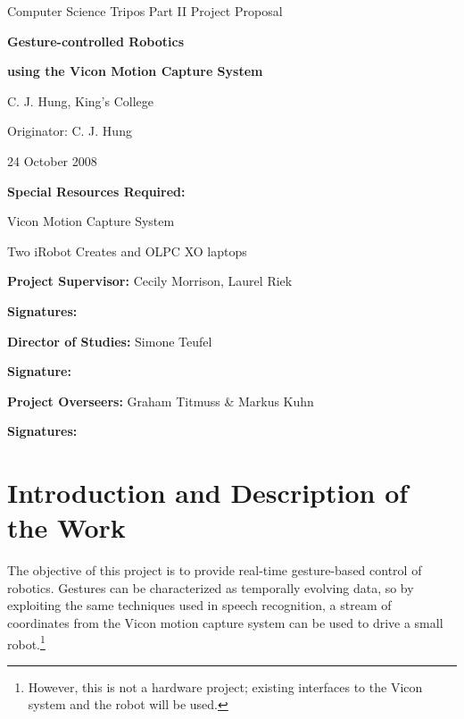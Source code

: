 \vfil

\centerline{\Large Computer Science Tripos Part II Project Proposal}
\vspace{0.4in}
\centerline{\Large \bf{Gesture-controlled Robotics}}
\vspace{0.1in}
\centerline{\Large \bf{using the Vicon Motion Capture System}}
\vspace{0.5in}
\centerline{\large C. J. Hung, King's College}
\vspace{0.2in}
\centerline{\large Originator: C. J. Hung}
\vspace{0.2in}
\centerline{\large 24 October 2008}

\vfil

\vspace{0.75in}

\noindent
{\bf Special Resources Required:}

Vicon Motion Capture System

Two iRobot Creates and OLPC XO laptops
\vspace{0.2in}

\noindent
{\bf Project Supervisor:} Cecily Morrison, Laurel Riek
\vspace{0.2in}

{\bf Signatures:}
\vspace{0.5in}

\noindent
{\bf Director of Studies:} Simone Teufel
\vspace{0.2in}

{\bf Signature:}
\vspace{0.5in}
 
\noindent
{\bf Project Overseers:} Graham Titmuss \& Markus Kuhn
\vspace{0.2in}

{\bf Signatures:}
\vspace{0.5in}

\vfil
\pagebreak

\section*{Introduction and Description of the Work}

The objective of this project is to provide real-time gesture-based control of robotics. Gestures can be characterized as temporally evolving data, so by exploiting the same techniques used in speech recognition, a stream of coordinates from the Vicon motion capture system can be used to drive a small robot.\footnote{However, this is not a hardware project; existing interfaces to the Vicon system and the robot will be used.}

